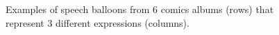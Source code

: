 	\begin{figure}[!ht]	%
	  \centering
		\caption[Relation between speech balloon shape and contour informations]{Examples of speech balloons from 6 comics albums (rows) that represent 3 different expressions (columns).}
		\label{fig:in:contour_style}
	\end{figure}






